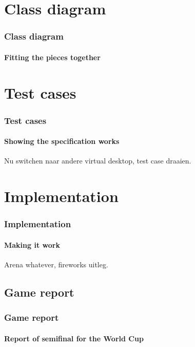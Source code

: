 \documentclass{beamer}
\begin{document}
	\section{Class diagram}
	\begin{frame}
		\frametitle{Class diagram}
		\framesubtitle{Fitting the pieces together}
		
	\end{frame}

	\section{Test cases}
	\begin{frame}
		\frametitle{Test cases}
		\framesubtitle{Showing the specification works}

		Nu switchen naar andere virtual desktop, test case draaien.

	\end{frame}

	\section{Implementation}
	\begin{frame}
		\frametitle{Implementation}
		\framesubtitle{Making it work}
		Arena whatever, fireworks uitleg.
	\end{frame}
	\subsection{Game report}
	\begin{frame}
		\frametitle{Game report}
		\framesubtitle{Report of semifinal for the World Cup}
	\end{frame}
\end{document}
